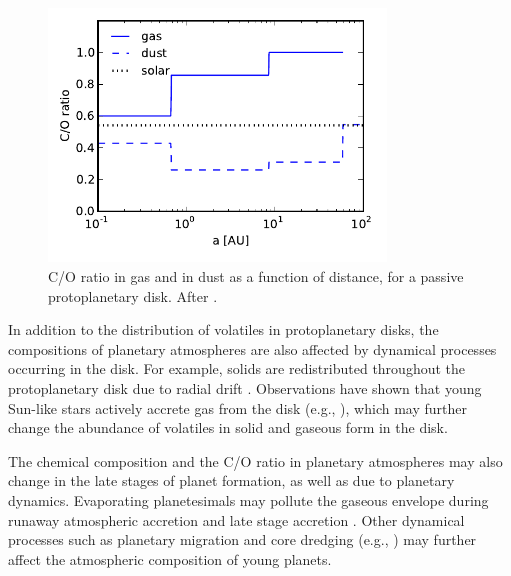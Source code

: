 \documentclass[manuscript]{aastex}
\begin{document}




\begin{figure}[htb]
\centering
\includegraphics[width=0.8\textwidth]{../figs/C_O_ratio_2.pdf}
\caption{C/O ratio in gas and in dust as a function of distance, for a passive protoplanetary disk. After \citet{oberg11}.} %
\label{fig:CtoO}
\end{figure}



In addition to the distribution of volatiles in protoplanetary disks, the compositions of planetary atmospheres are also affected by dynamical processes occurring in the disk. For example, solids are redistributed throughout the protoplanetary disk due to radial drift \citep{chiang10}. Observations have shown that young Sun-like stars actively accrete gas from the disk (e.g., \citealt{hartmann06}), which may further change the abundance of volatiles in solid and gaseous form in the disk. 

The chemical composition and the C/O ratio in planetary atmospheres may also change in the late stages of planet formation, as well as due to planetary dynamics. Evaporating planetesimals may pollute the gaseous envelope during runaway atmospheric accretion and late stage accretion \citep{oberg11}. Other dynamical processes such as planetary migration \citep{armitage10} and core dredging (e.g., \citealt{lodders09}) may further affect the atmospheric composition of young planets.
\end{document}
